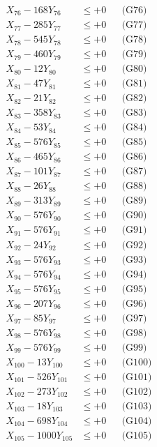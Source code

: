 \documentclass[a4paper,10pt]{article}
\begin{document}
{\begin{align}
X_{76} - 168Y_{76} &\leq +0 && \text{(G76)} \\
X_{77} - 285Y_{77} &\leq +0 && \text{(G77)} \\
X_{78} - 545Y_{78} &\leq +0 && \text{(G78)} \\
X_{79} - 460Y_{79} &\leq +0 && \text{(G79)} \\
X_{80} - 12Y_{80} &\leq +0 && \text{(G80)} \\
\allowbreak
X_{81} - 47Y_{81} &\leq +0 && \text{(G81)} \\
X_{82} - 21Y_{82} &\leq +0 && \text{(G82)} \\
X_{83} - 358Y_{83} &\leq +0 && \text{(G83)} \\
X_{84} - 53Y_{84} &\leq +0 && \text{(G84)} \\
X_{85} - 576Y_{85} &\leq +0 && \text{(G85)} \\
X_{86} - 465Y_{86} &\leq +0 && \text{(G86)} \\
X_{87} - 101Y_{87} &\leq +0 && \text{(G87)} \\
X_{88} - 26Y_{88} &\leq +0 && \text{(G88)} \\
X_{89} - 313Y_{89} &\leq +0 && \text{(G89)} \\
X_{90} - 576Y_{90} &\leq +0 && \text{(G90)} \\
\allowbreak
X_{91} - 576Y_{91} &\leq +0 && \text{(G91)} \\
X_{92} - 24Y_{92} &\leq +0 && \text{(G92)} \\
X_{93} - 576Y_{93} &\leq +0 && \text{(G93)} \\
X_{94} - 576Y_{94} &\leq +0 && \text{(G94)} \\
X_{95} - 576Y_{95} &\leq +0 && \text{(G95)} \\
X_{96} - 207Y_{96} &\leq +0 && \text{(G96)} \\
X_{97} - 85Y_{97} &\leq +0 && \text{(G97)} \\
X_{98} - 576Y_{98} &\leq +0 && \text{(G98)} \\
X_{99} - 576Y_{99} &\leq +0 && \text{(G99)} \\
X_{100} - 13Y_{100} &\leq +0 && \text{(G100)} \\
\allowbreak
X_{101} - 526Y_{101} &\leq +0 && \text{(G101)} \\
X_{102} - 273Y_{102} &\leq +0 && \text{(G102)} \\
X_{103} - 18Y_{103} &\leq +0 && \text{(G103)} \\
X_{104} - 698Y_{104} &\leq +0 && \text{(G104)} \\
X_{105} - 1000Y_{105} &\leq +0 && \text{(G105)} \\

\end{align}}
\end{document}
